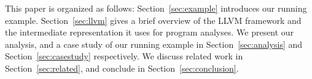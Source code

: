 This paper is organized as follows: Section~\ref{sec:example}
introduces our running example. Section~\ref{sec:llvm} gives
a brief overview of the LLVM framework and the intermediate
representation it uses for program analyses. We present our
analysis, and a case study of our running example in
Section~\ref{sec:analysis} and Section~\ref{sec:casestudy}
respectively. We discuss related work in Section~\ref{sec:related},
and conclude in Section~\ref{sec:conclusion}.